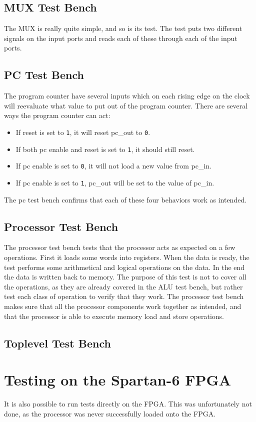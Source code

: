 \subsection{MUX Test Bench}

The MUX is really quite simple, and so is its test.
The test puts two different signals on the input ports and reads each of these through each of the input ports.

\subsection{PC Test Bench}

The program counter have several inputs which on each rising edge on the clock will reevaluate what value to put out of the program counter.
There are several ways the program counter can act:
\begin{itemize}
\item{If reset is set to \texttt{1}, it will reset pc\_out to \texttt{0}.}
\item{If both pc enable and reset is set to \texttt{1}, it should still reset.}
\item{If pc enable is set to \texttt{0}, it will not load a new value from pc\_in.}
\item{If pc enable is set to \texttt{1}, pc\_out will be set to the value of pc\_in.}
\end{itemize}
The pc test bench confirms that each of these four behaviors work as intended.


\subsection{Processor Test Bench}

The processor test bench tests that the processor acts as expected on a few operations.
First it loads some words into registers.
When the data is ready, the test performs some arithmetical and logical operations on the data.
In the end the data is written back to memory.
The purpose of this test is not to cover all the operations, as they are already covered in the ALU test bench, but rather test each class of operation to verify that they work.
The processor test bench makes sure that all the processor components work together as intended, and that the processor is able to execute memory load and store operations.

\subsection{Toplevel Test Bench}



\section{Testing on the Spartan-6 FPGA}

It is also possible to run tests directly on the FPGA.
This was unfortunately not done, as the processor was never successfully loaded onto the FPGA.
